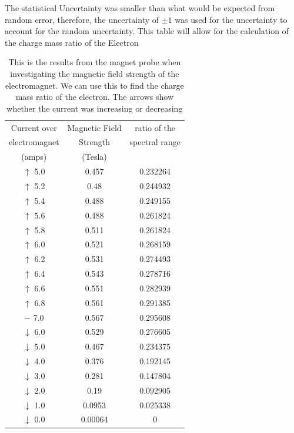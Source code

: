 \documentclass[a4paper,11pt]{article}
\begin{document}
The statistical Uncertainty was smaller than what would be expected from random error, therefore, the uncertainty of $\pm 1$ was used for the uncertainty to account for the random uncertainty. This table will allow for the calculation of the charge mass ratio of the Electron\\

\begin{table}[hbt!]
    \centering
    \begin{tabular}{|c|c|c|}
    \hline
         Current over & Magnetic Field & ratio of the\\
          electromagnet & Strength & spectral range \\
          (amps) & (Tesla) & \\
    \hline\hline
         $\uparrow$ 5.0 & 0.457 & 0.232264 \\
         $\uparrow$ 5.2 & 0.48 & 0.244932\\
         $\uparrow$ 5.4 & 0.488 & 0.249155\\
         $\uparrow$ 5.6 & 0.488 & 0.261824\\
         $\uparrow$ 5.8 & 0.511 & 0.261824\\
         $\uparrow$ 6.0 & 0.521 & 0.268159\\
         $\uparrow$ 6.2 & 0.531 & 0.274493\\
         $\uparrow$ 6.4 & 0.543 & 0.278716\\
         $\uparrow$ 6.6 & 0.551 & 0.282939\\
         $\uparrow$ 6.8 & 0.561 & 0.291385\\
         $-$ 7.0 & 0.567 & 0.295608\\
         $\downarrow$ 6.0 & 0.529 & 0.276605\\
         $\downarrow$ 5.0 & 0.467 & 0.234375\\
         $\downarrow$ 4.0 & 0.376 & 0.192145\\
         $\downarrow$ 3.0 & 0.281 & 0.147804\\
         $\downarrow$ 2.0 & 0.19 & 0.092905\\
         $\downarrow$ 1.0 & 0.0953 & 0.025338\\
         $\downarrow$ 0.0 & 0.00064 & 0\\
         \hline
    \end{tabular}
    \caption{This is the results from the magnet probe when investigating the magnetic field strength of the electromagnet. We can use this to find the charge mass ratio of the electron. The arrows show whether the current was increasing or decreasing}
    \label{tab:Why are we still here?}
\end{table}
\end{document}
